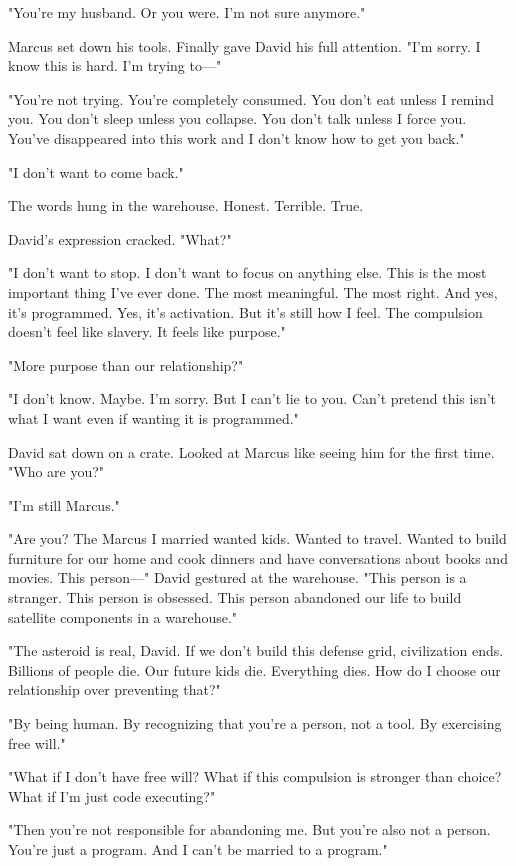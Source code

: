 "You're my husband. Or you were. I'm not sure anymore."

Marcus set down his tools. Finally gave David his full attention. "I'm sorry. I know this is hard. I'm trying to—"

"You're not trying. You're completely consumed. You don't eat unless I remind you. You don't sleep unless you collapse. You don't talk unless I force you. You've disappeared into this work and I don't know how to get you back."

"I don't want to come back."

The words hung in the warehouse. Honest. Terrible. True.

David's expression cracked. "What?"

"I don't want to stop. I don't want to focus on anything else. This is the most important thing I've ever done. The most meaningful. The most right. And yes, it's programmed. Yes, it's activation. But it's still how I feel. The compulsion doesn't feel like slavery. It feels like purpose."

"More purpose than our relationship?"

"I don't know. Maybe. I'm sorry. But I can't lie to you. Can't pretend this isn't what I want even if wanting it is programmed."

David sat down on a crate. Looked at Marcus like seeing him for the first time. "Who are you?"

"I'm still Marcus."

"Are you? The Marcus I married wanted kids. Wanted to travel. Wanted to build furniture for our home and cook dinners and have conversations about books and movies. This person—" David gestured at the warehouse. "This person is a stranger. This person is obsessed. This person abandoned our life to build satellite components in a warehouse."

"The asteroid is real, David. If we don't build this defense grid, civilization ends. Billions of people die. Our future kids die. Everything dies. How do I choose our relationship over preventing that?"

"By being human. By recognizing that you're a person, not a tool. By exercising free will."

"What if I don't have free will? What if this compulsion is stronger than choice? What if I'm just code executing?"

"Then you're not responsible for abandoning me. But you're also not a person. You're just a program. And I can't be married to a program."

